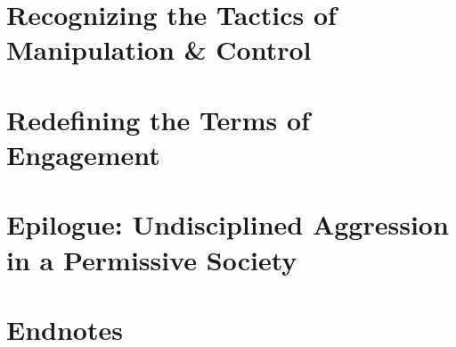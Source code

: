\documentclass{article}
\numberwithin{equation}{section}
\begin{document}
\section{Recognizing the Tactics of Manipulation \& Control}


\section{Redefining the Terms of Engagement}


\section{Epilogue: Undisciplined Aggression in a Permissive Society}


\section{Endnotes}


\printbibliography[heading=bibintoc]
	
\end{document}
